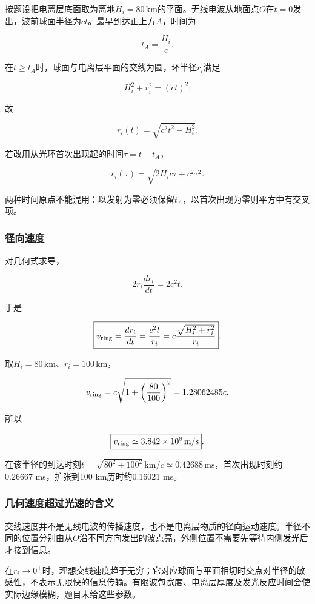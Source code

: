 \documentclass[12pt,a4paper,fontset=fandol]{ctexart}
\begin{document}
按题设把电离层底面取为离地\(H_i=80\,\mathrm{km}\)的平面。无线电波从地面点\(O\)在\(t=0\)发出，波前球面半径为\(ct\)。最早到达正上方\(A\)，时间为

\[
t_A=\frac{H_i}{c}.
\]

在\(t\ge t_A\)时，球面与电离层平面的交线为圆，环半径\(r_i\)满足

\[
H_i^2+r_i^2=(ct)^2.
\]

故

\[
\boxed{r_i(t)=\sqrt{c^2t^2-H_i^2}}.
\]

若改用从光环首次出现起的时间\(\tau=t-t_A\)，

\[
r_i(\tau)=\sqrt{2H_ic\tau+c^2\tau^2}.
\]

两种时间原点不能混用：以发射为零必须保留\(t_A\)，以首次出现为零则平方中有交叉项。

\subsubsection{径向速度}\label{ux5f84ux5411ux901fux5ea6}

对几何式求导，

\[
2r_i\frac{dr_i}{dt}=2c^2t.
\]

于是

\[
\boxed{
v_{\rm ring}=\frac{dr_i}{dt}
=\frac{c^2t}{r_i}
=c\frac{\sqrt{H_i^2+r_i^2}}{r_i}}.
\]

取\(H_i=80\,\mathrm{km}\)、\(r_i=100\,\mathrm{km}\)，

\[
v_{\rm ring}
=c\sqrt{1+\left(\frac{80}{100}\right)^2}
=1.28062485c.
\]

所以

\[
\boxed{v_{\rm ring}\simeq3.842\times10^8\,\mathrm{m/s}}.
\]

在该半径的到达时刻\(t=\sqrt{80^2+100^2}\,\mathrm{km}/c\simeq0.42688\,\mathrm{ms}\)，首次出现时刻约0.26667
ms，扩张到100 km历时约0.16021 ms。

\subsubsection{几何速度超过光速的含义}\label{ux51e0ux4f55ux901fux5ea6ux8d85ux8fc7ux5149ux901fux7684ux542bux4e49}

交线速度并不是无线电波的传播速度，也不是电离层物质的径向运动速度。半径不同的位置分别由从\(O\)沿不同方向发出的波点亮，外侧位置不需要先等待内侧发光后才接到信息。

在\(r_i\to0^+\)时，理想交线速度趋于无穷；它对应球面与平面相切时交点对半径的敏感性，不表示无限快的信息传输。有限波包宽度、电离层厚度及发光反应时间会使实际边缘模糊，题目未给这些参数。
\end{document}
